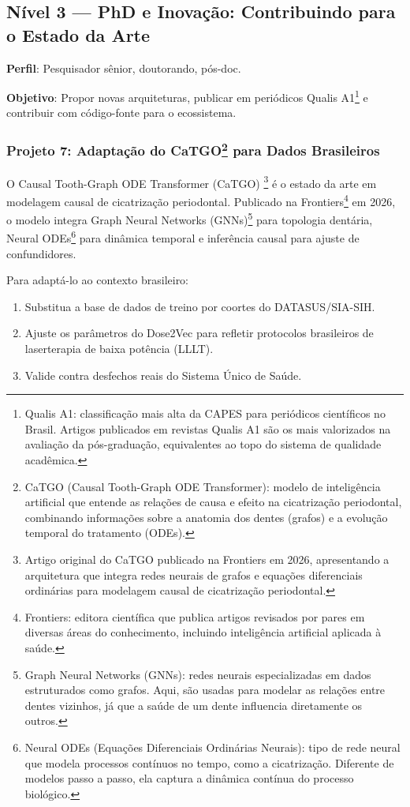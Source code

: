 \subsection{Nível 3 — PhD e Inovação: Contribuindo para o Estado da Arte}

\textbf{Perfil}: Pesquisador sênior, doutorando, pós-doc.

\textbf{Objetivo}: Propor novas arquiteturas, publicar em periódicos Qualis A1\protect\footnote{Qualis A1: classificação mais alta da CAPES para periódicos científicos no Brasil. Artigos publicados em revistas Qualis A1 são os mais valorizados na avaliação da pós-graduação, equivalentes ao topo do sistema de qualidade acadêmica.} e contribuir com código-fonte para o ecossistema.

\subsubsection*{Projeto 7: Adaptação do CaTGO\protect\footnote{CaTGO (Causal Tooth-Graph ODE Transformer): modelo de inteligência artificial que entende as relações de causa e efeito na cicatrização periodontal, combinando informações sobre a anatomia dos dentes (grafos) e a evolução temporal do tratamento (ODEs).} para Dados Brasileiros}

O Causal Tooth-Graph ODE Transformer (CaTGO) \cite{catgo2026}\footnote{Artigo original do CaTGO publicado na Frontiers em 2026, apresentando a arquitetura que integra redes neurais de grafos e equações diferenciais ordinárias para modelagem causal de cicatrização periodontal.} é o estado da arte em modelagem causal de cicatrização periodontal. Publicado na Frontiers\protect\footnote{Frontiers: editora científica que publica artigos revisados por pares em diversas áreas do conhecimento, incluindo inteligência artificial aplicada à saúde.} em 2026, o modelo integra Graph Neural Networks (GNNs)\protect\footnote{Graph Neural Networks (GNNs): redes neurais especializadas em dados estruturados como grafos. Aqui, são usadas para modelar as relações entre dentes vizinhos, já que a saúde de um dente influencia diretamente os outros.} para topologia dentária, Neural ODEs\protect\footnote{Neural ODEs (Equações Diferenciais Ordinárias Neurais): tipo de rede neural que modela processos contínuos no tempo, como a cicatrização. Diferente de modelos passo a passo, ela captura a dinâmica contínua do processo biológico.} para dinâmica temporal e inferência causal para ajuste de confundidores.

Para adaptá-lo ao contexto brasileiro:
\begin{enumerate}
    \item Substitua a base de dados de treino por coortes do DATASUS/SIA-SIH.
    \item Ajuste os parâmetros do Dose2Vec para refletir protocolos brasileiros de laserterapia de baixa potência (LLLT).
    \item Valide contra desfechos reais do Sistema Único de Saúde.
\end{enumerate}


